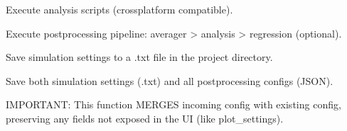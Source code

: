 \documentclass[a4paper,11pt,english,openany,oneside]{sphinxmanual}
\begin{document}

\begin{fulllineitems}
\label{\detokenize{modules/api:app.api.run_analysis}}
\pysigstartsignatures
\pysiglinewithargsret
{}
{}
{}
\pysigstopsignatures
\sphinxAtStartPar
Execute analysis scripts (cross\sphinxhyphen{}platform compatible).

\end{fulllineitems}


\begin{fulllineitems}
\label{\detokenize{modules/api:app.api.process_data}}
\pysigstartsignatures
\pysiglinewithargsret
{}
{}
{}
\pysigstopsignatures
\sphinxAtStartPar
Execute post\sphinxhyphen{}processing pipeline: averager \sphinxhyphen{}> analysis \sphinxhyphen{}> regression (optional).

\end{fulllineitems}


\begin{fulllineitems}
\label{\detokenize{modules/api:app.api.save_settings}}
\pysigstartsignatures
\pysiglinewithargsret
{}
{}
{}
\pysigstopsignatures
\sphinxAtStartPar
Save simulation settings to a .txt file in the project directory.

\end{fulllineitems}


\begin{fulllineitems}
\label{\detokenize{modules/api:app.api.save_all_settings}}
\pysigstartsignatures
\pysiglinewithargsret
{}
{}
{}
\pysigstopsignatures
\sphinxAtStartPar
Save both simulation settings (.txt) and all post\sphinxhyphen{}processing configs (JSON).

\sphinxAtStartPar
IMPORTANT: This function MERGES incoming config with existing config,
preserving any fields not exposed in the UI (like plot\_settings).

\end{fulllineitems}
\end{document}
